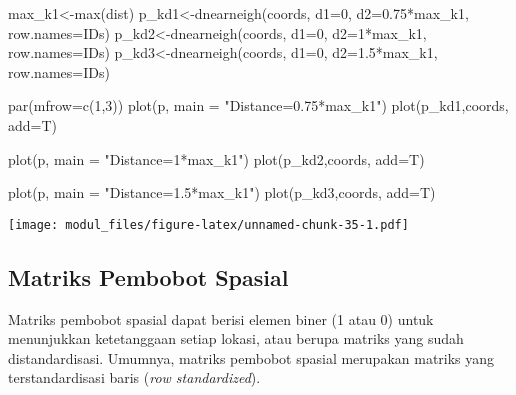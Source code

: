 \documentclass[
]{book}
\newenvironment{Shaded}{\begin{snugshade}}{\end{snugshade}}
\newcommand{\AttributeTok}[1]{\textcolor[rgb]{0.77,0.63,0.00}{#1}}
\newcommand{\DecValTok}[1]{\textcolor[rgb]{0.00,0.00,0.81}{#1}}
\newcommand{\FloatTok}[1]{\textcolor[rgb]{0.00,0.00,0.81}{#1}}
\newcommand{\FunctionTok}[1]{\textcolor[rgb]{0.00,0.00,0.00}{#1}}
\newcommand{\NormalTok}[1]{#1}
\newcommand{\OtherTok}[1]{\textcolor[rgb]{0.56,0.35,0.01}{#1}}
\newcommand{\SpecialCharTok}[1]{\textcolor[rgb]{0.00,0.00,0.00}{#1}}
\newcommand{\StringTok}[1]{\textcolor[rgb]{0.31,0.60,0.02}{#1}}
\begin{document}
\begin{Shaded}
\begin{Highlighting}[]
\NormalTok{max\_k1}\OtherTok{\textless{}{-}}\FunctionTok{max}\NormalTok{(dist)}
\NormalTok{p\_kd1}\OtherTok{\textless{}{-}}\FunctionTok{dnearneigh}\NormalTok{(coords, }\AttributeTok{d1=}\DecValTok{0}\NormalTok{, }\AttributeTok{d2=}\FloatTok{0.75}\SpecialCharTok{*}\NormalTok{max\_k1, }\AttributeTok{row.names=}\NormalTok{IDs)}
\NormalTok{p\_kd2}\OtherTok{\textless{}{-}}\FunctionTok{dnearneigh}\NormalTok{(coords, }\AttributeTok{d1=}\DecValTok{0}\NormalTok{, }\AttributeTok{d2=}\DecValTok{1}\SpecialCharTok{*}\NormalTok{max\_k1, }\AttributeTok{row.names=}\NormalTok{IDs)}
\NormalTok{p\_kd3}\OtherTok{\textless{}{-}}\FunctionTok{dnearneigh}\NormalTok{(coords, }\AttributeTok{d1=}\DecValTok{0}\NormalTok{, }\AttributeTok{d2=}\FloatTok{1.5}\SpecialCharTok{*}\NormalTok{max\_k1, }\AttributeTok{row.names=}\NormalTok{IDs)}

\FunctionTok{par}\NormalTok{(}\AttributeTok{mfrow=}\FunctionTok{c}\NormalTok{(}\DecValTok{1}\NormalTok{,}\DecValTok{3}\NormalTok{))}
\FunctionTok{plot}\NormalTok{(p, }\AttributeTok{main =} \StringTok{"Distance=0.75*max\_k1"}\NormalTok{)}
\FunctionTok{plot}\NormalTok{(p\_kd1,coords, }\AttributeTok{add=}\NormalTok{T)}

\FunctionTok{plot}\NormalTok{(p, }\AttributeTok{main =} \StringTok{"Distance=1*max\_k1"}\NormalTok{)}
\FunctionTok{plot}\NormalTok{(p\_kd2,coords, }\AttributeTok{add=}\NormalTok{T)}

\FunctionTok{plot}\NormalTok{(p, }\AttributeTok{main =} \StringTok{"Distance=1.5*max\_k1"}\NormalTok{)}
\FunctionTok{plot}\NormalTok{(p\_kd3,coords, }\AttributeTok{add=}\NormalTok{T)}
\end{Highlighting}
\end{Shaded}

\texttt{[image: modul\_files/figure-latex/unnamed-chunk-35-1.pdf]}

\hypertarget{matriks-pembobot-spasial}{%
\subsection{Matriks Pembobot Spasial}\label{matriks-pembobot-spasial}}

Matriks pembobot spasial dapat berisi elemen biner (1 atau 0) untuk menunjukkan ketetanggaan setiap lokasi, atau berupa matriks yang sudah distandardisasi. Umumnya, matriks pembobot spasial merupakan matriks yang terstandardisasi baris (\emph{row standardized}).
\end{document}
